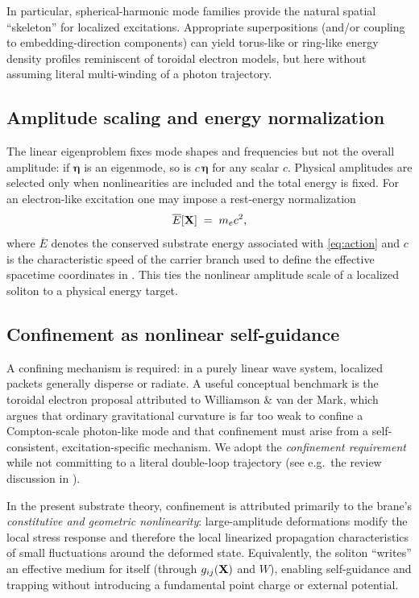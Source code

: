 In particular, spherical-harmonic mode families provide the natural spatial ``skeleton'' for localized excitations.
Appropriate superpositions (and/or coupling to embedding-direction components) can yield torus-like or ring-like
energy density profiles reminiscent of toroidal electron models, but here without assuming literal multi-winding
of a photon trajectory.

\subsection{Amplitude scaling and energy normalization}

The linear eigenproblem fixes mode shapes and frequencies but not the overall amplitude:
if $\bm{\eta}$ is an eigenmode, so is $c\,\bm{\eta}$ for any scalar $c$.
Physical amplitudes are selected only when nonlinearities are included and the total energy is fixed.
For an electron-like excitation one may impose a rest-energy normalization
\begin{equation}
  \overline{E}[\mathbf{X}] \;=\; m_e c^2,
  \label{eq:rest-energy-normalization}
\end{equation}
where $\overline{E}$ denotes the conserved substrate energy associated with \eqref{eq:action} and $c$ is the
characteristic speed of the carrier branch used to define the effective spacetime coordinates in .
This ties the nonlinear amplitude scale of a localized soliton to a physical energy target.

\subsection{Confinement as nonlinear self-guidance}

A confining mechanism is required: in a purely linear wave system, localized packets generally disperse or radiate.
A useful conceptual benchmark is the toroidal electron proposal attributed to Williamson \& van der Mark, which argues
that ordinary gravitational curvature is far too weak to confine a Compton-scale photon-like mode and that confinement
must arise from a self-consistent, excitation-specific mechanism.
We adopt the \emph{confinement requirement} while not committing to a literal double-loop trajectory
(see e.g.\ the review discussion in \citep{HuygensOptics2025}).

In the present substrate theory, confinement is attributed primarily to the brane's \emph{constitutive and geometric
nonlinearity}: large-amplitude deformations modify the local stress response and therefore the local linearized
propagation characteristics of small fluctuations around the deformed state.
Equivalently, the soliton ``writes'' an effective medium for itself (through $g_{ij}(\mathbf{X})$ and $W$), enabling
self-guidance and trapping without introducing a fundamental point charge or external potential.

